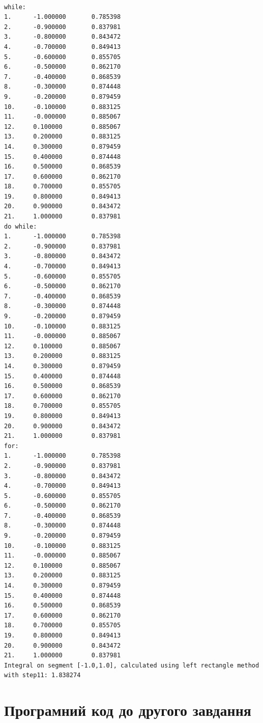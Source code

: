 \documentclass{article}
\begin{document}
\begin{lstlisting}

while:
1.      -1.000000       0.785398
2.      -0.900000       0.837981
3.      -0.800000       0.843472
4.      -0.700000       0.849413
5.      -0.600000       0.855705
6.      -0.500000       0.862170
7.      -0.400000       0.868539
8.      -0.300000       0.874448
9.      -0.200000       0.879459
10.     -0.100000       0.883125
11.     -0.000000       0.885067
12.     0.100000        0.885067
13.     0.200000        0.883125
14.     0.300000        0.879459
15.     0.400000        0.874448
16.     0.500000        0.868539
17.     0.600000        0.862170
18.     0.700000        0.855705
19.     0.800000        0.849413
20.     0.900000        0.843472
21.     1.000000        0.837981
do while:
1.      -1.000000       0.785398
2.      -0.900000       0.837981
3.      -0.800000       0.843472
4.      -0.700000       0.849413
5.      -0.600000       0.855705
6.      -0.500000       0.862170
7.      -0.400000       0.868539
8.      -0.300000       0.874448
9.      -0.200000       0.879459
10.     -0.100000       0.883125
11.     -0.000000       0.885067
12.     0.100000        0.885067
13.     0.200000        0.883125
14.     0.300000        0.879459
15.     0.400000        0.874448
16.     0.500000        0.868539
17.     0.600000        0.862170
18.     0.700000        0.855705
19.     0.800000        0.849413
20.     0.900000        0.843472
21.     1.000000        0.837981
for:
1.      -1.000000       0.785398
2.      -0.900000       0.837981
3.      -0.800000       0.843472
4.      -0.700000       0.849413
5.      -0.600000       0.855705
6.      -0.500000       0.862170
7.      -0.400000       0.868539
8.      -0.300000       0.874448
9.      -0.200000       0.879459
10.     -0.100000       0.883125
11.     -0.000000       0.885067
12.     0.100000        0.885067
13.     0.200000        0.883125
14.     0.300000        0.879459
15.     0.400000        0.874448
16.     0.500000        0.868539
17.     0.600000        0.862170
18.     0.700000        0.855705
19.     0.800000        0.849413
20.     0.900000        0.843472
21.     1.000000        0.837981
Integral on segment [-1.0,1.0], calculated using left rectangle method with step11: 1.838274
\end{lstlisting}

\section{Програмний код до другого завдання}
\end{document}
